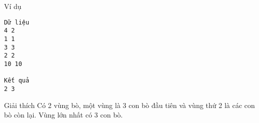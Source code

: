 Ví dụ  
\begin{verbatim}
Dữ liệu
4 2
1 1
3 3
2 2
10 10

Kết quả
2 3
\end{verbatim}
   Giải thích  
Có 2 vùng bò, một vùng là 3 con bò đầu tiên và vùng thứ 2 là các con bò còn lại. Vùng lớn nhất có 3 con bò.